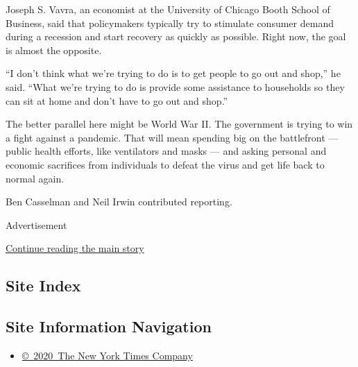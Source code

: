 Joseph S. Vavra, an economist at the University of Chicago Booth School
of Business, said that policymakers typically try to stimulate consumer
demand during a recession and start recovery as quickly as possible.
Right now, the goal is almost the opposite.

``I don't think what we're trying to do is to get people to go out and
shop,'' he said. ``What we're trying to do is provide some assistance to
households so they can sit at home and don't have to go out and shop.''

The better parallel here might be World War II. The government is trying
to win a fight against a pandemic. That will mean spending big on the
battlefront --- public health efforts, like ventilators and masks ---
and asking personal and economic sacrifices from individuals to defeat
the virus and get life back to normal again.

Ben Casselman and Neil Irwin contributed reporting.

Advertisement

\protect\hyperlink{after-bottom}{Continue reading the main story}

\hypertarget{site-index}{%
\subsection{Site Index}\label{site-index}}

\hypertarget{site-information-navigation}{%
\subsection{Site Information
Navigation}\label{site-information-navigation}}

\begin{itemize}
\tightlist
\item
  \href{https://help.nytimes3xbfgragh.onion/hc/en-us/articles/115014792127-Copyright-notice}{©~2020~The
  New York Times Company}
\end{itemize}

